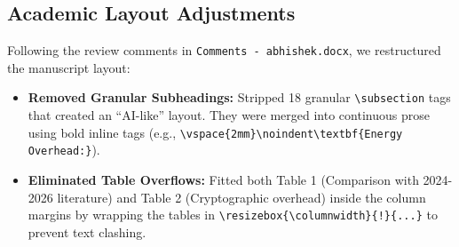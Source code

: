 \documentclass[11pt,a4paper]{article}
\begin{document}
\subsection{Academic Layout Adjustments}
Following the review comments in \texttt{Comments - abhishek.docx}, we restructured the manuscript layout:
\begin{itemize}
    \item \textbf{Removed Granular Subheadings:} Stripped 18 granular \texttt{\textbackslash subsection} tags that created an ``AI-like'' layout. They were merged into continuous prose using bold inline tags (e.g., \texttt{\textbackslash vspace\{2mm\}\textbackslash noindent\textbackslash textbf\{Energy Overhead:\}}).
    \item \textbf{Eliminated Table Overflows:} Fitted both Table 1 (Comparison with 2024-2026 literature) and Table 2 (Cryptographic overhead) inside the column margins by wrapping the tables in \texttt{\textbackslash resizebox\{\textbackslash columnwidth\}\{!\}\{...\}} to prevent text clashing.
\end{itemize}
\end{document}

